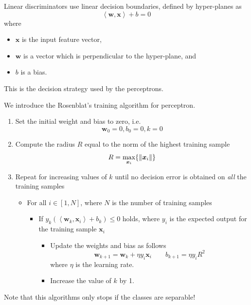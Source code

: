 \documentclass[oneside,onecolumn]{report}
\newcommand{\inp}[2]{\left\langle #1, #2 \right\rangle}
\begin{document}
Linear discriminators use linear decision boundaries, defined by hyper-planes as
$$ \inp{\bm w}{\bm x} + b = 0 $$
where
\begin{itemize}
    \item $\bm x$ is the input feature vector,
    \item $\bm w$ is a vector which is perpendicular to the hyper-plane, and
    \item $b$ is a bias.
\end{itemize}

This is the decision strategy used by the perceptrons.

We introduce the Rosenblat's training algorithm for perceptron.
\begin{enumerate}
    \item Set the initial weight and bias to zero, i.e.
    $$ \bm w_0 = 0, b_0 = 0, k = 0 $$

    \item Compute the radius $R$ equal to the norm of the highest training sample
    $$ R = \max_{\bm x_i}\{\norm{\bm x_i}\} $$

    \item Repeat for increasing values of $k$ until no decision error is obtained on \emph{all} the training samples
    \begin{itemize}
        \item For all $i \in [1, N]$, where $N$ is the number of training samples
        \begin{itemize}[label=\textbullet]
            \item If $y_k (\inp{\bm w_k}{\bm x_i} + b_k) \leq 0$ holds, where $y_i$ is the expected output for the training sample $\bm x_i$
            \begin{itemize}[label=\textbullet]
                \item Update the weights and bias as follows
                $$ \bm w_{k + 1} = \bm w_k + \eta y_i \bm x_i \qquad b_{k + 1} = \eta y_i R^2 $$
                where $\eta$ is the learning rate.
                \item Increase the value of $k$ by 1.
            \end{itemize}
        \end{itemize}
    \end{itemize}
\end{enumerate}

Note that this algorithms only stops if the classes are separable!
\end{document}
